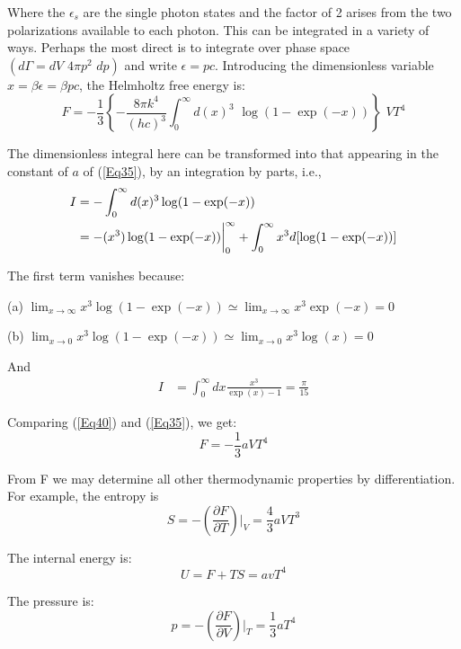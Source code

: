 \documentclass[book.tex]{subfiles}
\begin{document}
Where the $\epsilon_{s}$ are the single photon states and the factor of 2 arises from the two polarizations available to each photon. This can be integrated in a variety of ways. Perhaps the most direct is to integrate over phase space $(d\Gamma=dV\,\,4\pi p^{2}\,\,dp)$ and write $\epsilon=pc$. Introducing the dimensionless variable $x = \beta \epsilon = \beta pc$, the Helmholtz free energy is:
\begin{equation}\label{Eq40}
F = -\frac{1}{3} \left\lbrace -\frac{8\pi k^{4}}{(hc)^{3}} \int_{0}^{\infty} d(x)^{3} \,\, \log(1-\exp(-x)) \right\rbrace \,\, VT^{4}  
\end{equation}

The dimensionless integral here can be transformed into that appearing in the constant of $a$ of (\ref{Eq35}), by an integration by parts, i.e., 
\begin{align}\label{Eq41}
I &= -  \int_{0}^{\infty} d(x)^{3} \log(1-\exp(-x)) \notag \\
&= - (x^{3}) \log(1-\exp(-x))\bigg|_{0}^{\infty} + \int_{0}^{\infty} x^{3} d[\log(1-\exp(-x))]
\end{align}

The first term vanishes because:

(a) $\lim_{x \to \infty} x^{3} \log(1-\exp(-x)) \simeq \lim_{x \to \infty} x^{3} \exp(-x) = 0$

(b) $\lim_{x \to 0} x^{3} \log(1-\exp(-x)) \simeq \lim_{x \to 0} x^{3} \log(x) = 0$

And
\begin{align}\label{Eq42}
I &= \int_{0}^{\infty} dx \frac{x^{3}}{\exp(x)-1} = \frac{\pi}{15}
\end{align}

Comparing (\ref{Eq40}) and (\ref{Eq35}), we get:
\begin{equation}\label{Eq43}
F = -\frac{1}{3} aVT^{4}
\end{equation}

From F we may determine all other thermodynamic properties by differentiation. For example, the entropy is
\begin{equation}\label{Eq44}
S = -\left(\frac{\partial F}{\partial T}\right) \bigg|_{V} = \frac{4}{3} aVT^{3}
\end{equation}

The internal energy is:
\begin{equation}\label{Eq45}
U = F +TS = avT^{4}
\end{equation}

The pressure is:
\begin{equation}\label{Eq46}
p = -\left(\frac{\partial F}{\partial V}\right) \bigg|_{T}  = \frac{1}{3} aT^{4}
\end{equation}
\end{document}
